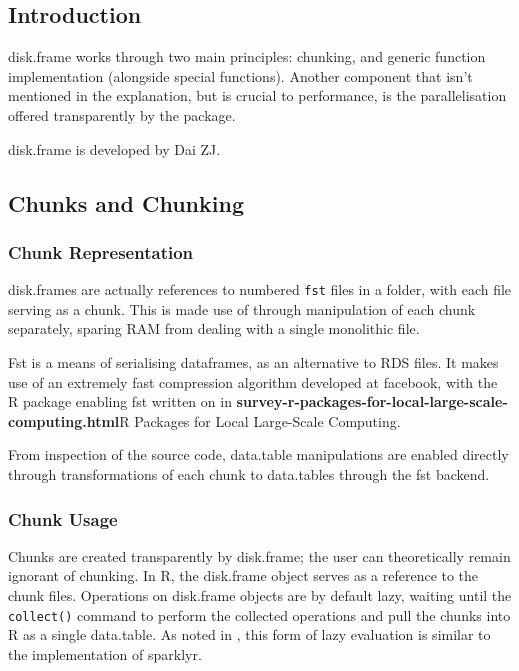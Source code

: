 \hypertarget{introduction}{%
    \subsection{Introduction}\label{sec:disk-frame-introduction}}

disk.frame works through two main principles: chunking, and generic
function implementation (alongside special functions). Another component
that isn't mentioned in the explanation, but is crucial to performance,
is the parallelisation offered transparently by the package.

disk.frame is developed by Dai ZJ.

\hypertarget{sec:chunking}{%
    \subsection{Chunks and Chunking}\label{sec:chunking}}

\hypertarget{sec:chunk-representation}{%
    \subsubsection{Chunk Representation}\label{sec:chunk-representation}}

disk.frames are actually references to numbered \texttt{fst} files in a
folder, with each file serving as a chunk. This is made use of through
manipulation of each chunk separately, sparing RAM from dealing with a
single monolithic file\cite{zj19:_inges_data}.

Fst is a means of serialising dataframes, as an alternative to RDS
files\cite{klik19}. It makes use of an extremely fast compression
algorithm developed at facebook, with the R package enabling fst written
on in \textbf{survey-r-packages-for-local-large-scale-computing.html}{R
    Packages for Local Large-Scale Computing}.

From inspection of the source code, data.table manipulations are enabled
directly through transformations of each chunk to data.tables through
the fst backend.

\hypertarget{sec:making-chunks}{%
    \subsubsection{Chunk Usage}\label{sec:making-chunks}}

Chunks are created transparently by disk.frame; the user can
theoretically remain ignorant of chunking. In R, the disk.frame object
serves as a reference to the chunk files. Operations on disk.frame
objects are by default lazy, waiting until the
\texttt{collect()} command to perform the
collected operations and pull the chunks into R as a single data.table.
As noted in \cite{zj19:_simpl_verbs_lazy_evaluat}, this form of lazy
evaluation is similar to the implementation of sparklyr.


